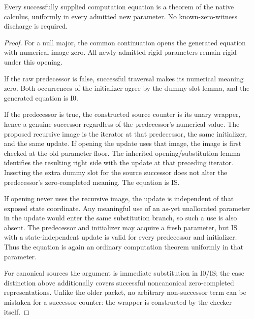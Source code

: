 \begin{theorem}
\label{up:uniform-supply}
Every successfully supplied computation equation is a theorem of the
native calculus, uniformly in every admitted new parameter. No
known-zero-witness discharge is required.
\end{theorem}
\begin{proof}
For a null major, the common continuation opens the generated equation
with numerical image zero. All newly admitted rigid parameters remain
rigid under this opening.

If the raw predecessor is false, successful traversal makes its numerical
meaning zero. Both occurrences of the initializer agree by the dummy-slot
lemma, and the generated equation is I0.

If the predecessor is true, the constructed source counter is its unary
wrapper, hence a genuine successor regardless of the predecessor's
numerical value. The proposed recursive image is the iterator at that
predecessor, the same initializer, and the same update.
If opening the update uses that image, the image is first checked at the
old parameter floor. The inherited opening/substitution lemma identifies
the resulting right side with the update at that preceding iterator.
Inserting the extra dummy slot for the source successor does not alter
the predecessor's zero-completed meaning. The equation is IS.

If opening never uses the recursive image, the update is independent of
that exposed state coordinate. Any meaningful use of an as-yet
unallocated parameter in the update would enter the same substitution
branch, so such a use is also absent. The predecessor and initializer
may acquire a fresh parameter, but IS with a state-independent update is
valid for every predecessor and initializer. Thus the equation is again
an ordinary computation theorem uniformly in that parameter.

For canonical sources the argument is immediate substitution in I0/IS;
the case distinction above additionally covers successful noncanonical
zero-completed representations. Unlike the older packet, no arbitrary
non-successor term can be mistaken for a successor counter: the wrapper
is constructed by the checker itself.
\end{proof}

